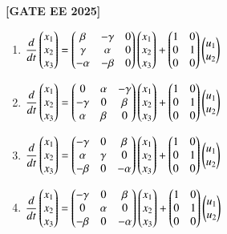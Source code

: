 \documentclass[12pt]{article}
\begin{document}
\begin{enumerate}[leftmargin=*, label=\textbf{Q.\arabic*:}]
\noindent \textbf{[GATE EE 2025]}
\begin{enumerate}
  \item $\dfrac{d}{dt}
    \begin{pmatrix}
      x_1 \\ x_2 \\ x_3
    \end{pmatrix}
    =
    \begin{pmatrix}
      \beta & -\gamma & 0 \\
      \gamma & \alpha & 0 \\
      -\alpha & -\beta & 0
    \end{pmatrix}
    \begin{pmatrix}
      x_1 \\ x_2 \\ x_3
    \end{pmatrix}
    +
    \begin{pmatrix}
      1 & 0 \\
      0 & 1 \\
      0 & 0
    \end{pmatrix}
    \begin{pmatrix}
      u_1 \\ u_2
    \end{pmatrix}
   $
  \item $\dfrac{d}{dt}
    \begin{pmatrix}
      x_1 \\ x_2 \\ x_3
    \end{pmatrix}
    =
    \begin{pmatrix}
      0 & \alpha & -\gamma \\
      -\gamma & 0 & \beta \\
      \alpha & \beta & 0
    \end{pmatrix}
    \begin{pmatrix}
      x_1 \\ x_2 \\ x_3
    \end{pmatrix}
    +
    \begin{pmatrix}
      1 & 0 \\
      0 & 1 \\
      0 & 0
    \end{pmatrix}
    \begin{pmatrix}
      u_1 \\ u_2
    \end{pmatrix}
   $
  \item $\dfrac{d}{dt}
    \begin{pmatrix}
      x_1 \\ x_2 \\ x_3
    \end{pmatrix}
    =
    \begin{pmatrix}
      -\gamma & 0 & \beta \\
      \alpha & \gamma & 0 \\
      -\beta & 0 & -\alpha
    \end{pmatrix}
    \begin{pmatrix}
      x_1 \\ x_2 \\ x_3
    \end{pmatrix}
    +
    \begin{pmatrix}
      1 & 0 \\
      0 & 1 \\
      0 & 0
    \end{pmatrix}
    \begin{pmatrix}
      u_1 \\ u_2
    \end{pmatrix}
   $
  \item $\dfrac{d}{dt}
    \begin{pmatrix}
      x_1 \\ x_2 \\ x_3
    \end{pmatrix}
    =
    \begin{pmatrix}
      -\gamma & 0 & \beta \\
      0 & \alpha & 0 \\
      -\beta & 0 & -\alpha
    \end{pmatrix}
    \begin{pmatrix}
      x_1 \\ x_2 \\ x_3
    \end{pmatrix}
    +
    \begin{pmatrix}
      1 & 0 \\
      0 & 1 \\
      0 & 0
    \end{pmatrix}
    \begin{pmatrix}
      u_1 \\ u_2
    \end{pmatrix}
   $
\end{enumerate}


\end{enumerate}
\end{document}
